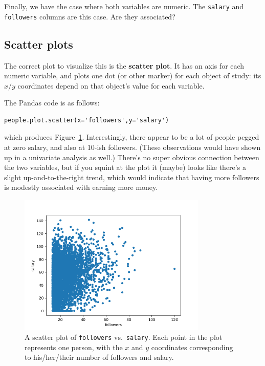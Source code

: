 Finally, we have the case where both variables are numeric. The \texttt{salary}
and \texttt{followers} columns are this case. Are they associated?

\subsection{Scatter plots}

The correct plot to visualize this is the \textbf{scatter plot}. It has an
axis for each numeric variable, and plots one dot (or other marker) for each
object of study: its $x$/$y$ coordinates depend on that object's value for each
variable.

The Pandas code is as follows:

\begin{Verbatim}[fontsize=\small,samepage=true,frame=single,framesep=3mm]
people.plot.scatter(x='followers',y='salary')
\end{Verbatim}

which produces Figure~\ref{fig:followersSalary}. Interestingly, there appear to
be a lot of people pegged at zero salary, and also at 10-ish followers. (These
observations would have shown up in a univariate analysis as well.) There's no
super obvious connection between the two variables, but if you squint at the
plot it (maybe) looks like there's a slight up-and-to-the-right trend, which
would indicate that having more followers is modestly associated with earning
more money.

\begin{figure}[ht]
\centering
\includegraphics[width=0.8\textwidth]{followersSalary.png}
\caption{A scatter plot of \texttt{followers} vs.~\texttt{salary}. Each point
in the plot represents one person, with the $x$ and $y$ coordinates
corresponding to his/her/their number of followers and salary.}
\label{fig:followersSalary}
\end{figure}

